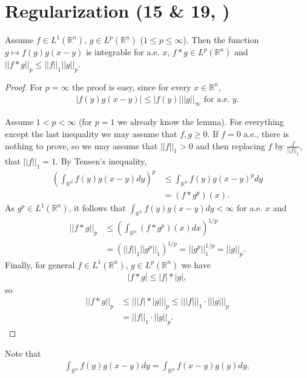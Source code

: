 \section{Regularization \tiny{(15 \& 19, \cite{schilling2017measures})}}
\begin{lemma}
    Assume \(f\in L^1(\mathbb{R}^n)\), \(g\in L^p(\mathbb{R}^n)\) (\(1\leq p\leq \infty\)). Then the function \(g\mapsto f(g)g(x-y)\) is integrable for a.e. \(x\), \(f\ast g\in L^p(\mathbb{R}^n)\) and \(||f\ast g||_p \leq ||f||_1 ||g||_p\).
\end{lemma}
\ifdetailed 
\begin{proof}
    For \(p=\infty\) the proof is easy, since for every \(x\in\mathbb{R}^n\),
    \begin{align*}
        |f(y)g(x-y)|\leq |f(y)| ||g||_{\infty   } \text{ for a.e. }y.
    \end{align*} 

    Assume \(1<p<\infty\) (for \(p=1\) we already know the lemma). For everything except the last inequality we may assume that \(f,g\geq 0\). If \(f=0\) a.e., there is nothing to prove, so we may assume that \(||f||_1>0\) and then replacing \(f\) by \(\frac{f}{||f||_1}\), that \(||f||_1 = 1\). By Tensen's inequality,
    \begin{align*}
        \left(\int_{\mathbb{R}^n}f(y)g(x-y)dy\right)^p &\leq \int_{\mathbb{R}^n} f(y)g(x-y)^pdy \\
        &=(f\ast g^p)(x).
    \end{align*}
    As \(g^p\in L^1(\mathbb{R}^n)\), it follows that \(\int_{\mathbb{R}^n} f(y) g(x-y)dy<\infty\) for a.e. \(x\) and
    \begin{align*}
        ||f\ast g||_p &\leq \left(\int_{\mathbb{R}^n}(f\ast g^p)(x)dx\right)^{1/p} \\
        &= \left(||f||_1 ||g^p||_1\right)^{1/p} = ||g^p||_{1}^{1/p} = ||g||_p.
    \end{align*} 
    Finally, for general \(f\in L^1(\mathbb{R}^n)\), \(g\in L^p(\mathbb{R}^n)\) we have
    \begin{align*}
        |f\ast g| \leq |f|\ast |g|,
    \end{align*}
    so 
    \begin{align*}
        ||f\ast g||_p &\leq || |f| \ast |g| ||_p \leq || |f| ||_1 \cdot || |g| ||_p\\
        &= ||f||_1 \cdot ||g||_p.
    \end{align*}
\end{proof}
\fi 
Note that 
\begin{align*}
    \int_{\mathbb{R}^n}f(y)g(x-y)dy = \int_{\mathbb{R}^n} f(x-y)g(y)dy,
\end{align*}
